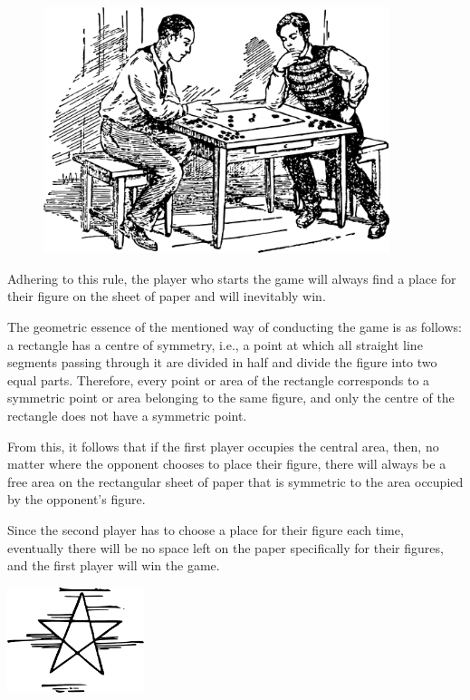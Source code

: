 \begin{figure}[h!]
\centering
\includegraphics[width=0.9\textwidth]{figures/ch-10/fig-159.pdf}
\end{figure}


Adhering to this rule, the player who starts the game will always find a place for their figure on the sheet of paper and will inevitably win.

The geometric essence of the mentioned way of conducting the game is as follows: a rectangle has a centre of symmetry, i.e., a point at which all straight line segments passing through it are divided in half and divide the figure into two equal parts. Therefore, every point or area of the rectangle corresponds to a symmetric point or area belonging to the same figure, and only the centre of the rectangle does not have a symmetric point.

From this, it follows that if the first player occupies the central area, then, no matter where the opponent chooses to place their figure, there will always be a free area on the rectangular sheet of paper that is symmetric to the area occupied by the opponent's figure.

Since the second player has to choose a place for their figure each time, eventually there will be no space left on the paper specifically for their figures, and the first player will win the game.

\begin{center}
\includegraphics[width=0.3\textwidth]{figures/ch-10/fig-ch-10-tail.pdf}
\end{center}


















